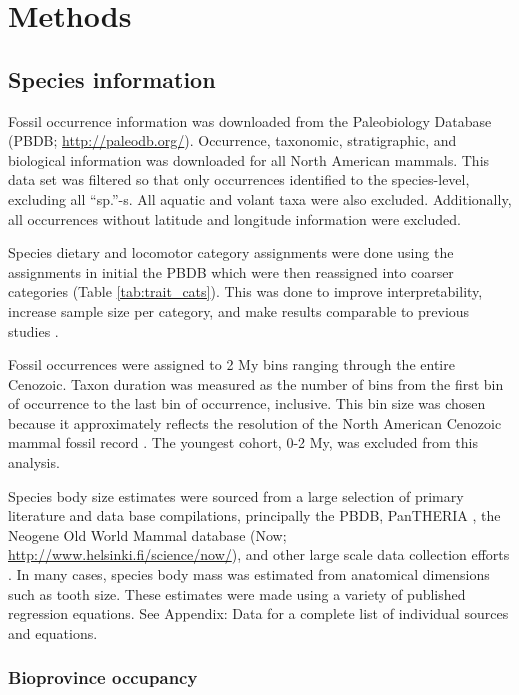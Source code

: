 \documentclass[12pt,letterpaper]{article}
\begin{document}
\section{Methods}

\subsection{Species information}

Fossil occurrence information was downloaded from the Paleobiology Database (PBDB; \url{http://paleodb.org/}). Occurrence, taxonomic, stratigraphic, and biological information was downloaded for all North American mammals. This data set was filtered so that only occurrences identified to the species-level, excluding all ``sp.''-s. All aquatic and volant taxa were also excluded. Additionally, all occurrences without latitude and longitude information were excluded.

Species dietary and locomotor category assignments were done using the assignments in initial the PBDB which were then reassigned into coarser categories (Table \ref{tab:trait_cats}). This was done to improve interpretability, increase sample size per category, and make results comparable to previous studies \citep{Jernvall2004,Price2012}.

Fossil occurrences were assigned to 2 My bins ranging through the entire Cenozoic. Taxon duration was measured as the number of bins from the first bin of occurrence to the last bin of occurrence, inclusive. This bin size was chosen because it approximately reflects the resolution of the North American Cenozoic mammal fossil record \citep{Alroy2009,Marcot2014,Alroy2000g}. The youngest cohort, 0-2 My, was excluded from this analysis.

Species body size estimates were sourced from a large selection of primary literature and data base compilations, principally the PBDB, PanTHERIA \citep{Jones2009c}, the Neogene Old World Mammal database (Now; \url{http://www.helsinki.fi/science/now/}), and other large scale data collection efforts \citep{Smith2004c, Raia2012f, Brook2004a, Freudenthal2013, McKenna2011}. In many cases, species body mass was estimated from anatomical dimensions such as tooth size. These estimates were made using a variety of published regression equations. See Appendix: Data for a complete list of individual sources and equations. %


\subsubsection{Bioprovince occupancy}
\end{document}
